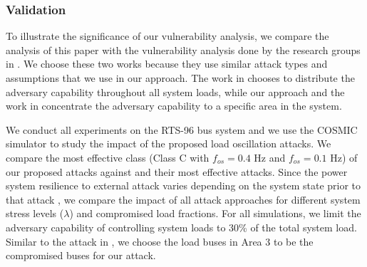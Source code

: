 \documentclass[journal]{IEEEtran}
\begin{document}


\subsubsection{Validation}To illustrate the significance of our vulnerability analysis, we compare the analysis of this paper with the vulnerability analysis done by the research groups in \cite{Anu,carter}. We choose these two works because they use similar attack types and assumptions that we use in our approach. The work in \cite{Anu} chooses to distribute the adversary capability throughout all system loads, while our approach and the work in  \cite{carter} concentrate the adversary capability to a specific area in the system.

We conduct all experiments on the RTS-96 bus system and we use the COSMIC simulator to study the impact of the proposed load oscillation attacks. We compare the most effective class (Class C with $f_{os} = 0.4$ Hz and $f_{os} = 0.1$ Hz) of our proposed attacks against \cite{Anu,carter} and their most effective attacks. Since the power system resilience to external attack varies depending on the system state prior to that attack \cite{stress}, we compare the impact of all attack approaches for different system stress levels ($\lambda$) and compromised load fractions. For all simulations, we limit the adversary capability of controlling system loads to 30\% of the total system load. Similar to the attack in \cite{carter}, we choose the load buses in Area 3 to be the compromised buses for our attack.  
\end{document}
